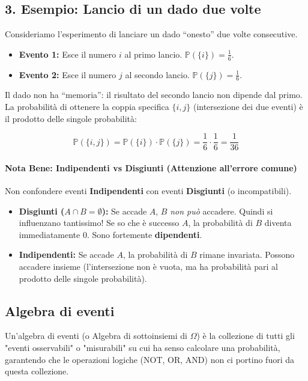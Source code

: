 \subsection{3. Esempio: Lancio di un dado due volte}

Consideriamo l'esperimento di lanciare un dado ``onesto'' due volte consecutive.
\begin{itemize}
    \item \textbf{Evento 1:} Esce il numero $i$ al primo lancio. $\mathbb{P}(\{i\}) = \frac{1}{6}$.
    \item \textbf{Evento 2:} Esce il numero $j$ al secondo lancio. $\mathbb{P}(\{j\}) = \frac{1}{6}$.
\end{itemize}

Il dado non ha ``memoria'': il risultato del secondo lancio non dipende dal primo.
\\La probabilità di ottenere la coppia specifica $\{i, j\}$ (intersezione dei due eventi) è il prodotto delle singole probabilità:

\[
\mathbb{P}(\{i, j\}) = \mathbb{P}(\{i\}) \cdot \mathbb{P}(\{j\}) = \frac{1}{6} \cdot \frac{1}{6} = \frac{1}{36}
\]

\paragraph{Nota Bene: Indipendenti vs Disgiunti (Attenzione all'errore comune)}

Non confondere eventi \textbf{Indipendenti} con eventi \textbf{Disgiunti} (o incompatibili).

\begin{itemize}
    \item \textbf{Disgiunti ($A \cap B = \emptyset$):} Se accade $A$, $B$ \emph{non può} accadere. Quindi si influenzano tantissimo! Se so che è successo $A$, la probabilità di $B$ diventa immediatamente 0. Sono fortemente \textbf{dipendenti}.
    
    \item \textbf{Indipendenti:} Se accade $A$, la probabilità di $B$ rimane invariata. Possono accadere insieme (l'intersezione non è vuota, ma ha probabilità pari al prodotto delle singole probabilità).
\end{itemize}

\subsection{Algebra di eventi}
Un'algebra di eventi (o Algebra di sottoinsiemi di $\Omega$) è la collezione di tutti gli "eventi osservabili" o "misurabili" su cui ha senso calcolare una probabilità, garantendo che le operazioni logiche (NOT, OR, AND) non ci portino fuori da questa collezione.

